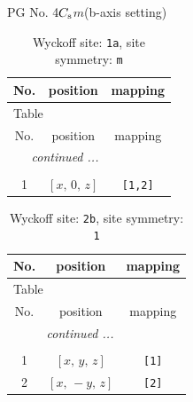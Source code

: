 \documentclass[fleqn,8pt]{jsarticle}
\begin{document}
\setcounter{MaxMatrixCols}{32}

\renewcommand{\tablename}{Table~}
\renewcommand{\figurename}{Figure~}
\begin{center}
\LARGE
PG No. 4\quad$C_{\rm s}$\quad$m$\quad(b-axis setting)\quad[ monoclinic ]
\end{center}
\renewcommand{\arraystretch}{1.2}
\begin{longtable}{ccc}
\caption{Wyckoff site: {\tt 1a}, site symmetry: {\tt m}}
 \\
 \hline \hline
No. & position & mapping \\ \hline \endfirsthead

\multicolumn{2}{l}{\tablename\ \thetable{}} \\
 \hline \hline
No. & position & mapping \\ \hline \endhead

 \hline \hline
\multicolumn{2}{r}{\footnotesize\it continued ...} \\ \endfoot

 \hline \hline
\multicolumn{2}{r}{} \\ \endlastfoot

1 & $\left[ x,\, 0,\, z \right]$ & {\tt [1,2]} \\
\end{longtable}
\renewcommand{\arraystretch}{1.2}
\begin{longtable}{ccc}
\caption{Wyckoff site: {\tt 2b}, site symmetry: {\tt 1}}
 \\
 \hline \hline
No. & position & mapping \\ \hline \endfirsthead

\multicolumn{2}{l}{\tablename\ \thetable{}} \\
 \hline \hline
No. & position & mapping \\ \hline \endhead

 \hline \hline
\multicolumn{2}{r}{\footnotesize\it continued ...} \\ \endfoot

 \hline \hline
\multicolumn{2}{r}{} \\ \endlastfoot

1 & $\left[ x,\, y,\, z \right]$ & {\tt [1]} \\ \hline
2 & $\left[ x,\, - y,\, z \right]$ & {\tt [2]} \\
\end{longtable}
\end{document}
